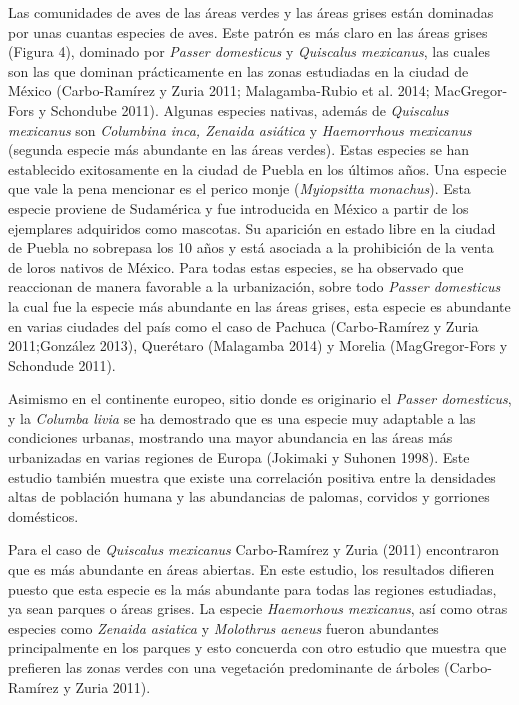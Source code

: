 \documentclass[letterpaper,12pt]{article}
\begin{document}
Las comunidades de aves de las áreas verdes y las áreas grises están dominadas por unas cuantas especies de aves.
Este patrón es más claro en las áreas grises (Figura 4), dominado por \textit{Passer domesticus} y \textit{Quiscalus mexicanus}, las cuales son las que dominan prácticamente en las zonas estudiadas en la ciudad de México (Carbo-Ramírez y Zuria 2011; Malagamba-Rubio et al. 2014; MacGregor-Fors y Schondube 2011). Algunas especies nativas, además de \textit{ Quiscalus mexicanus} son \textit{Columbina inca, Zenaida asiática} y \textit{Haemorrhous mexicanus} (segunda especie más abundante en las áreas verdes). Estas especies se han establecido exitosamente en la ciudad de Puebla en los últimos años.
Una especie que vale la pena mencionar es el perico monje (\textit{Myiopsitta monachus}). Esta especie proviene de Sudamérica y fue introducida en México a partir de los ejemplares adquiridos como mascotas. 
Su aparición en estado libre en la ciudad de Puebla no sobrepasa los 10 años y está asociada a la prohibición de la venta de loros nativos de México.
Para todas estas especies, se ha observado que reaccionan de manera favorable a la urbanización, sobre todo \textit{Passer domesticus} la  cual fue la especie  más abundante en las áreas grises, esta especie es abundante en varias ciudades del país como el caso de Pachuca (Carbo-Ramírez y Zuria 2011;González 2013), Querétaro (Malagamba  2014) y Morelia (MagGregor-Fors y Schondude 2011).

Asimismo en el continente europeo, sitio donde es originario el \textit{Passer domesticus}, y la \textit{Columba livia} se ha demostrado que es una especie muy adaptable a las condiciones urbanas, mostrando una mayor abundancia en las áreas más urbanizadas en varias regiones de Europa (Jokimaki y Suhonen 1998). 
Este estudio también muestra que existe una correlación positiva entre la densidades altas de población humana y las  abundancias de palomas, corvidos y gorriones domésticos.

Para el caso de \textit{Quiscalus mexicanus} Carbo-Ramírez y Zuria (2011) encontraron que es más abundante en áreas abiertas. En este estudio, los resultados difieren puesto que esta especie es la más abundante para todas las regiones estudiadas, ya sean parques o áreas grises. 
La especie \textit{Haemorhous mexicanus}, así como otras especies como \textit{Zenaida asiatica} y \textit{Molothrus aeneus} fueron abundantes principalmente en los parques y esto concuerda con otro estudio que muestra que prefieren las zonas verdes con una vegetación predominante de árboles (Carbo-Ramírez y Zuria 2011). %
\end{document}
